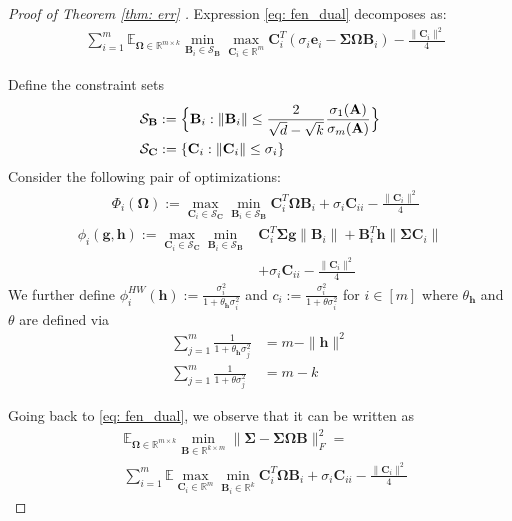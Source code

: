 \documentclass[conference]{IEEEtran}
\newcommand{\bA}{\mathbf{A}}
\newcommand{\bB}{\mathbf{B}}
\newcommand{\bC}{\mathbf{C}}
\newcommand{\bh}{\mathbf{h}}
\newcommand{\bbE}{\mathbb{E}}
\newcommand{\calS}{\mathcal{S}}
\begin{document}
\begin{proof}[Proof of Theorem \ref{thm: err} ]
Expression \eqref{eq: fen_dual} decomposes as:
\begin{align*}
    &\sum_{i=1}^{m} \mathbb{E}_{\boldsymbol{\Omega} \in \mathbb{R}^{m \times k}} \min_{\mathbf{B}_i \in \calS_{\bB}} \max_{\mathbf{C}_i \in \mathbb{R}^{m}} \mathbf{C}_i^T\left(\sigma_i\mathbf{e}_i - \boldsymbol{\Sigma}\boldsymbol{\Omega} \mathbf{B}_i\right) - \frac{\|\mathbf{C}_i\|^2}{4} \nonumber
\end{align*}

Define the constraint sets
\begin{align*}
    & \calS_{\bB} := \Bigl\{\bB_i: \|\bB_i\| \le \frac{2}{\sqrt{d} - \sqrt{k}}\frac{\sigma_1(\bA)}{\sigma_m(\bA)} \Bigr\} \\
    & \calS_{\bC} := \{\bC_i: \|\bC_i\| \le \sigma_i \}
\end{align*}   
Consider the following pair of optimizations:
\begin{align*}
    & \Phi_i(\boldsymbol{\Omega}) :=  \max_{\mathbf{C}_i \in \calS_{\bC}} \min_{\mathbf{B}_i \in \calS_{\bB}} \mathbf{C}_i^T \boldsymbol{\Omega} \mathbf{B}_i + \sigma_i\mathbf{C}_{ii}- \frac{\|\mathbf{C}_i\|^2}{4}
\end{align*}
\begin{align}
    \phi_i(\mathbf{g}, \mathbf{h}) :=  \max_{\mathbf{C}_i \in \calS_{\bC}} \min_{\mathbf{B}_i \in \calS_{\bB}} & \mathbf{C}_i^T \boldsymbol{\Sigma} \mathbf{g} \|\mathbf{B}_i\|   + \mathbf{B}_i^T \mathbf{h}\|\boldsymbol{\Sigma}\mathbf{C}_i\| \nonumber \\
    & + \sigma_i\mathbf{C}_{ii}- \frac{\|\mathbf{C}_i\|^2}{4} \label{eq: PO_AO}
\end{align}
We further define $\phi^{HW}_i(\mathbf{h}) := \frac{\sigma_i^2}{1 +\theta_{\bh}  \sigma_i^2}$ and $ c_i := \frac{\sigma_i^2}{1 +\theta  \sigma_i^2}$ for $i \in [m]$ where $\theta_\bh$ and $\theta$ are defined via
\begin{align*}
    \sum_{j=1}^m \frac{1}{1 + \theta_{\bh} \sigma_j^2} &= m - \|\mathbf{h}\|^2 \\
    \sum_{j=1}^m \frac{1}{1 + \theta \sigma_j^2} &= m - k
\end{align*}

Going back to \eqref{eq: fen_dual}, we observe that it can be written as
\begin{align*}
& \mathbb{E}_{\boldsymbol{\Omega} \in \mathbb{R}^{m \times k}} \min_{\mathbf{B} \in \mathbb{R}^{k \times m}} \|\boldsymbol{\Sigma} - \boldsymbol{\Sigma}\boldsymbol{\Omega} \mathbf{B}\|_F^2 = \\
& \sum_{i=1}^m \bbE \max_{\mathbf{C}_i \in \mathbb{R}^m} \min_{\mathbf{B}_i \in \mathbb{R}^k} \mathbf{C}_i^T \boldsymbol{\Omega} \mathbf{B}_i + \sigma_i\mathbf{C}_{ii}- \frac{\|\mathbf{C}_i\|^2}{4}
\end{align*}


\end{proof}
\end{document}
